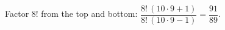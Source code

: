 Factor $8!$ from the top and bottom: $\dfrac{8!\,(10\cdot9+1)}{8!\,(10\cdot9-1)}=\boxed{\dfrac{91}{89}}$.
